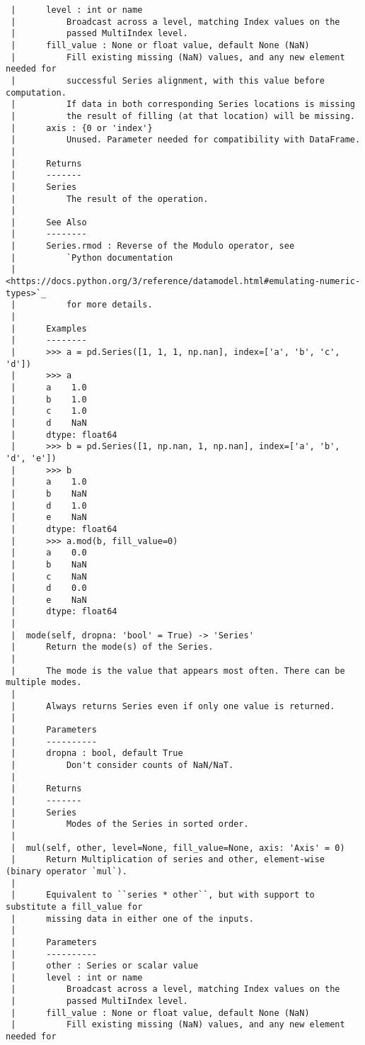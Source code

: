 \documentclass[
  letterpaper,
  DIV=11,
  numbers=noendperiod]{scrreprt}
\begin{document}
\begin{verbatim}
 |      level : int or name
 |          Broadcast across a level, matching Index values on the
 |          passed MultiIndex level.
 |      fill_value : None or float value, default None (NaN)
 |          Fill existing missing (NaN) values, and any new element needed for
 |          successful Series alignment, with this value before computation.
 |          If data in both corresponding Series locations is missing
 |          the result of filling (at that location) will be missing.
 |      axis : {0 or 'index'}
 |          Unused. Parameter needed for compatibility with DataFrame.
 |      
 |      Returns
 |      -------
 |      Series
 |          The result of the operation.
 |      
 |      See Also
 |      --------
 |      Series.rmod : Reverse of the Modulo operator, see
 |          `Python documentation
 |          <https://docs.python.org/3/reference/datamodel.html#emulating-numeric-types>`_
 |          for more details.
 |      
 |      Examples
 |      --------
 |      >>> a = pd.Series([1, 1, 1, np.nan], index=['a', 'b', 'c', 'd'])
 |      >>> a
 |      a    1.0
 |      b    1.0
 |      c    1.0
 |      d    NaN
 |      dtype: float64
 |      >>> b = pd.Series([1, np.nan, 1, np.nan], index=['a', 'b', 'd', 'e'])
 |      >>> b
 |      a    1.0
 |      b    NaN
 |      d    1.0
 |      e    NaN
 |      dtype: float64
 |      >>> a.mod(b, fill_value=0)
 |      a    0.0
 |      b    NaN
 |      c    NaN
 |      d    0.0
 |      e    NaN
 |      dtype: float64
 |  
 |  mode(self, dropna: 'bool' = True) -> 'Series'
 |      Return the mode(s) of the Series.
 |      
 |      The mode is the value that appears most often. There can be multiple modes.
 |      
 |      Always returns Series even if only one value is returned.
 |      
 |      Parameters
 |      ----------
 |      dropna : bool, default True
 |          Don't consider counts of NaN/NaT.
 |      
 |      Returns
 |      -------
 |      Series
 |          Modes of the Series in sorted order.
 |  
 |  mul(self, other, level=None, fill_value=None, axis: 'Axis' = 0)
 |      Return Multiplication of series and other, element-wise (binary operator `mul`).
 |      
 |      Equivalent to ``series * other``, but with support to substitute a fill_value for
 |      missing data in either one of the inputs.
 |      
 |      Parameters
 |      ----------
 |      other : Series or scalar value
 |      level : int or name
 |          Broadcast across a level, matching Index values on the
 |          passed MultiIndex level.
 |      fill_value : None or float value, default None (NaN)
 |          Fill existing missing (NaN) values, and any new element needed for

\end{verbatim}
\end{document}
